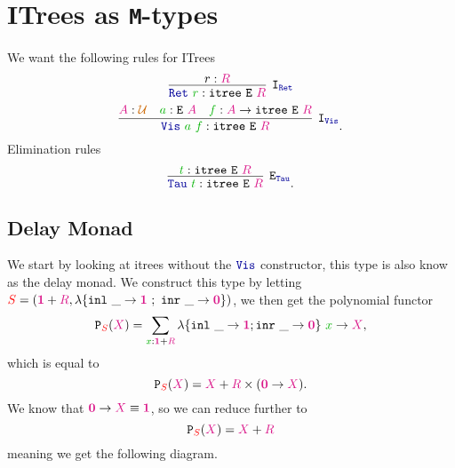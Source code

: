 \documentclass[twoside,11pt,openright]{report}
\theoremstyle{plain} %
\theoremstyle{definition}
\theoremstyle{remark}
\newcommand*{\term}[1]{\textcolor{green!70!black}{#1}} %
\newcommand*{\type}[1]{\textcolor{magenta!90!black}{#1}}
\newcommand*{\container}[1]{\textcolor{red}{#1}}
\newcommand*{\universe}[1]{\textcolor{orange!80!black}{#1}}
\newcommand*{\unit}{\type{\textbf{1}}}
\newcommand*{\empt}{\type{\textbf{0}}}
\newcommand*{\function}[1]{\textcolor{blue!60!black}{\ensuremath{\mathtt{#1}}}}
\newcommand*{\typeformer}[1]{\ensuremath{\mathtt{#1}}}
\newcommand*{\functor}[1]{\ensuremath{\mathbf{\mathtt{#1}}}}
\begin{document}
\section{ITrees as \texttt{M}-types}
We want the following rules for ITrees
\begin{equation}
  \infer[\mathtt{I}_{\function{Ret}}]{\function{Ret}~\term{r} : \typeformer{itree}~\typeformer{E}~\type{R}}{r : \type{R}}
\end{equation}
\begin{equation}
  \infer[\mathtt{I}_{\function{Vis}}]{\function{Vis}~\term{a}~\term{f} : \typeformer{itree}~\typeformer{E}~\type{R}}{\type{A} : \universe{\mathcal{U}} & \term{a} : \typeformer{E}~\type{A} & \term{f} : \type{A} \rightarrow \typeformer{itree}~\typeformer{E}~\type{R}}.
\end{equation}
Elimination rules
\begin{equation}
  \infer[\mathtt{E}_{\function{Tau}}]{\function{Tau}~\term{t} : \typeformer{itree}~\typeformer{E}~\type{R}}{\term{t} : \typeformer{itree}~\typeformer{E}~\type{R}}.
\end{equation}

\subsection{Delay Monad}
We start by looking at itrees without the \(\function{Vis}\) constructor, this type is also know as the delay monad. We construct this type by letting \(\container{S} = (\unit + \type{R},\lambda \{ \texttt{inl}~\_ \rightarrow \unit~;~\texttt{inr}~\_ \rightarrow \empt \})\), we then get the polynomial functor
\begin{equation}
  \functor{P}_{\container{S}}(\type{X}) = \sum_{\term{x} : \unit + \type{R}} \lambda \{ \texttt{inl}~\_ \rightarrow \unit ; \texttt{inr}~\_ \rightarrow \empt\}~\term{x} \rightarrow \type{X},
\end{equation}
which is equal to
\begin{equation}
  \functor{P}_{\container{S}}(\type{X}) = \type{X} + \type{R} \times (\empt \rightarrow \type{X}).
\end{equation}
We know that \(\empt \rightarrow \type{X} \equiv \unit\), so we can reduce further to
\begin{equation}
  \functor{P}_{\container{S}}(\type{X}) = \type{X} + \type{R}
\end{equation}
meaning we get the following diagram.
\end{document}
